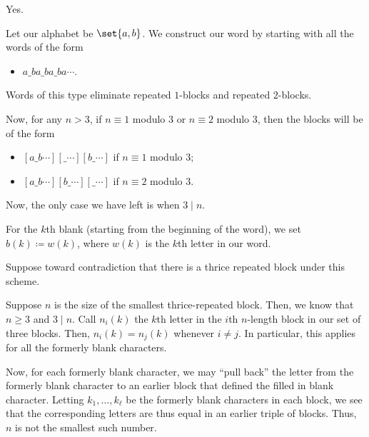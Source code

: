 \documentclass[10pt]{mypackage}
\begin{document}
\begin{solution}
  Yes.\newline

  Let our alphabet be $\set{a,b}$. We construct our word by starting with all the words of the form
  \begin{itemize}
    \item $a\_ba\_ba\_ba\cdots$.
  \end{itemize}
  Words of this type eliminate repeated $1$-blocks and repeated $2$-blocks.\newline

  Now, for any $n > 3$, if $n\equiv 1$ modulo $3$ or $n\equiv 2$ modulo $3$, then the blocks will be of the form
  \begin{itemize}
    \item $\left[ a\_b\cdots \right]\left[ \_\cdots \right]\left[ b\_\cdots \right]$ if $n\equiv 1$ modulo $3$;
    \item $\left[ a\_b\cdots \right]\left[ b\_\cdots \right]\left[ \_\cdots \right]$ if $n\equiv 2$ modulo $3$.
  \end{itemize}
  Now, the only case we have left is when $3 \mid n$.\newline

  For the $k$th blank (starting from the beginning of the word), we set $b(k) \coloneq w(k)$, where $w(k)$ is the $k$th letter in our word.\newline

  Suppose toward contradiction that there is a thrice repeated block under this scheme.\newline

  Suppose $n$ is the size of the smallest thrice-repeated block. Then, we know that $n\geq 3$ and $3 \mid n$. Call $n_i(k)$ the $k$th letter in the $i$th $n$-length block in our set of three blocks. Then, $n_i(k) = n_j(k)$ whenever $i\neq j$. In particular, this applies for all the formerly blank characters.\newline

  Now, for each formerly blank character, we may ``pull back'' the letter from the formerly blank character to an earlier block that defined the filled in blank character. Letting $k_1,\dots,k_\ell$ be the formerly blank characters in each block, we see that the corresponding letters are thus equal in an earlier triple of blocks. Thus, $n$ is not the smallest such number.
\end{solution}
\end{document}
